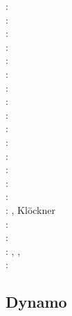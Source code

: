 \begin{scriptsize}
\nineteenseventythree: \cite{rehi73}\\
\nineteenninetyseven: \cite{bare97}\\
\nineteenninetyeight: \cite{cosh98}\\
\nineteenninetynine: \cite{riwg99}\\
\twothousand: \cite{coks00}\cite{brmm00}\cite{cacp00}\\
\twothousandtwo: \cite{cacp02}\cite{coks02}\cite{arbc02}\cite{gurw02}\\
\twothousandthree: \cite{cock03}\\
\twothousandfour: \cite{coks04}\\
\twothousandfive: \cite{cacs05}\cite{coks05}\cite{cogo05a}\cite{cogo05b}\cite{cogo05c}\\
\twothousandseven: \cite{coks07}\cite{feku07}\\
\twothousandeight: \cite{kans08}\cite{mofh08}\cite{dole08}\cite{pepe08}\\
\twothousandnine: \cite{coks09}\cite{cogo09}\cite{cogl09}\cite{ngpc09}\cite{shu09}\cite{codg08}\cite{cogw09}\\
\twothousandten: \cite{ngpc10}\cite{conp10}\cite{mofp10}\cite{kari10}\cite{cogs10}\\
\twothousandeleven: \cite{geor11}\cite{ngpc11}\\
\twothousandtwelve: \cite{kauf12}\cite{ngpe12}\cite[chapt. 31]{lomw12}\\
\twothousandthirteen: \cite{vyrc13}\cite{rhcv13}, Kl\"ockner \etal \cite{klwh13}\\
\twothousandfifteen: \cite{lelk15}\cite{kalc15}\\
\twothousandsixteen: \cite{cock16}\cite{makc16}\\
\twothousandseventeen: \cite{fewk17}\cite{iglo17},
                       \cite{hepb17}\cite{chll17},
                       \cite{sclu17a}\cite{sclu17b}
                       \cite{sclu17c}\cite{zhan17}\\
\twothousandeighteen: \cite{puth18}\cite{wogu18}\cite{fakr18}\cite{muwy18}
\end{scriptsize}

\subsection{Dynamo}

